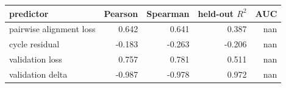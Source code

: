 \begin{tabular}{lrrrr}
\toprule
predictor & Pearson & Spearman & held-out $R^2$ & AUC\\
\midrule
pairwise alignment loss & 0.642 & 0.641 & 0.387 & nan\\
cycle residual & -0.183 & -0.263 & -0.206 & nan\\
validation loss & 0.757 & 0.781 & 0.511 & nan\\
validation delta & -0.987 & -0.978 & 0.972 & nan\\
\bottomrule
\end{tabular}
